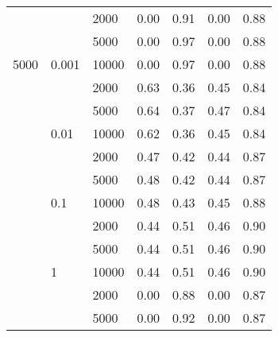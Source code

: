 \begin{tabular}{lllrrrr}
      &       & 2000 &       0.00 &       0.91 &       0.00 &       0.88 \\
      &       & 5000 &       0.00 &       0.97 &       0.00 &       0.88 \\
5000 & 0.001 & 10000 &       0.00 &       0.97 &       0.00 &       0.88 \\
      &       & 2000 &       0.63 &       0.36 &       0.45 &       0.84 \\
      &       & 5000 &       0.64 &       0.37 &       0.47 &       0.84 \\
      & 0.01 & 10000 &       0.62 &       0.36 &       0.45 &       0.84 \\
      &       & 2000 &       0.47 &       0.42 &       0.44 &       0.87 \\
      &       & 5000 &       0.48 &       0.42 &       0.44 &       0.87 \\
      & 0.1 & 10000 &       0.48 &       0.43 &       0.45 &       0.88 \\
      &       & 2000 &       0.44 &       0.51 &       0.46 &       0.90 \\
      &       & 5000 &       0.44 &       0.51 &       0.46 &       0.90 \\
      & 1 & 10000 &       0.44 &       0.51 &       0.46 &       0.90 \\
      &       & 2000 &       0.00 &       0.88 &       0.00 &       0.87 \\
      &       & 5000 &       0.00 &       0.92 &       0.00 &       0.87 \\
\bottomrule
\end{tabular}
